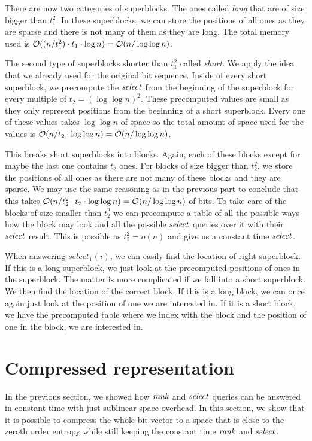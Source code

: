 There are now two categories of superblocks. The ones called \textit{long} that are of size bigger
than $t_1^2$. In these superblocks, we can store the positions of all ones as they are sparse
and there is not many of them as they are long. The total memory used is $\mathcal{O}((n/t_1^2)\cdot t_1\cdot
\log n) = \mathcal{O}(n/\log\log n)$.

The second type of superblocks shorter than $t_1^2$ called
\textit{short}. We apply the idea that we already used for the original bit sequence. Inside of
every short superblock, we precompute the $\mathit{select}$ from the beginning of the superblock for every
multiple of $t_2=(\log\log n)^2$. These precomputed values are small as they only represent positions
from the beginning of a short superblock. Every one of these values takes $\log\log n$ of space so the
total amount of space used for the values is $\mathcal{O}(n/t_2\cdot \log\log n) = \mathcal{O}(n/\log\log n)$.


This breaks short superblocks into blocks. Again, each of these blocks except for maybe the
last one contains $t_2$ ones. For blocks of size bigger than $t_2^2$, we store the positions of all
ones as there are not many of these blocks and they are sparse. We may use the same reasoning as
in the previous part to conclude that this takes $\mathcal{O}(n/t_2^2\cdot t_2\cdot \log\log n) = \mathcal{O}(n/\log\log n)$
of bits. To take care of the blocks of size smaller than $t_2^2$ we can precompute a table of all
the possible ways how the block may look and all the possible $\mathit{select}$ queries over it with
their $\mathit{select}$ result. This is possible as $t_2^2 = o(n)$ and give us a constant time $\mathit{select}$.

When answering $select_1(i)$, we can easily find the location of right superblock. If this
is a long superblock, we just look at the precomputed positions of ones in the superblock. The matter
is more complicated if we fall into a short superblock. We then find the location of the correct block.
If this is a long block, we can once again just look at the position of one we are interested
in. If it is a short block, we have the precomputed table where we index with the block and the position of
one in the block, we are interested in.

\section{Compressed representation}
\label{section:compressed_bv}

In the previous section, we showed how $\mathit{rank}$ and $\mathit{select}$ queries can be answered in constant
time with just sublinear space overhead. In this section, we show that it is possible to compress
the whole bit vector to a space that is close to the zeroth order entropy while still keeping the
constant time $\mathit{rank}$ and $\mathit{select}$.

